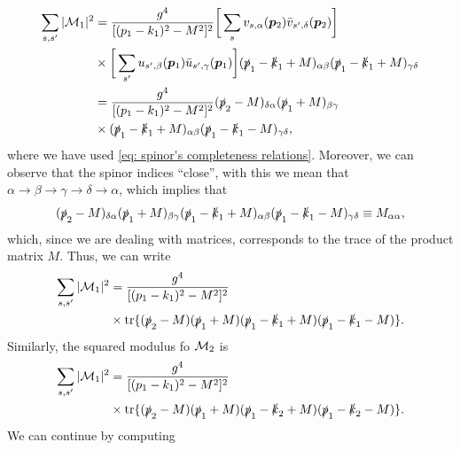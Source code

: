 \begin{equation}
    \begin{split}
        \sum_{s,s'}|\rsm_1|^2 &= \frac{g^4}{[(p_1 - k_1)^2 - M^2]^2}\bigg[\sum_{s}v_{s,\alpha}(\v{p}_2)\b{v}_{s',\delta}(\v{p}_2)\bigg] \\
        &\times \bigg[\sum_{s'}u_{s',\beta}(\v{p}_1)\b{u}_{s',\gamma}(\v{p}_1)\bigg](\sl{p}_1 - \sl{k}_1 + M)_{\alpha\beta}(\sl{p}_1 - \sl{k}_1 + M)_{\gamma\delta} \\
        &= \frac{g^4}{[(p_1 - k_1)^2 - M^2]^2}(\sl{p}_2 - M)_{\delta\alpha}(\sl{p}_1 + M)_{\beta\gamma}\\
        &\times (\sl{p}_1 - \sl{k}_1 + M)_{\alpha\beta}(\sl{p}_1 - \sl{k}_1 - M)_{\gamma\delta},
    \end{split}
\end{equation}
where we have used \eqref{eq: spinor's completeness relations}. Moreover, we can observe that the spinor indices ``close'', with this we mean that $\alpha \to \beta \to \gamma \to \delta \to \alpha$, which implies that
\begin{equation}
    (\sl{p}_2 - M)_{\delta\alpha}(\sl{p}_1 + M)_{\beta\gamma}(\sl{p}_1 - \sl{k}_1 + M)_{\alpha\beta}(\sl{p}_1 - \sl{k}_1 - M)_{\gamma\delta} \equiv M_{\alpha\alpha},
\end{equation} 
which, since we are dealing with matrices, corresponds to the trace of the product matrix $M$. Thus, we can write 
\begin{equation}
    \begin{split}
        \sum_{s,s'}|\rsm_1|^2 &= \frac{g^4}{[(p_1 - k_1)^2 - M^2]^2} \\
        &\times \tr{(\sl{p}_2 - M)(\sl{p}_1 + M)(\sl{p}_1 - \sl{k}_1 + M)(\sl{p}_1 - \sl{k}_1 - M)}.
    \end{split}
\end{equation} 
Similarly, the squared modulus fo $\rsm_2$ is 
\begin{equation}
    \begin{split}
        \sum_{s,s'}|\rsm_1|^2 &= \frac{g^4}{[(p_1 - k_1)^2 - M^2]^2} \\
        &\times \tr{(\sl{p}_2 - M)(\sl{p}_1 + M)(\sl{p}_1 - \sl{k}_2 + M)(\sl{p}_1 - \sl{k}_2 - M)}.
    \end{split}
\end{equation}
We can continue by computing 
